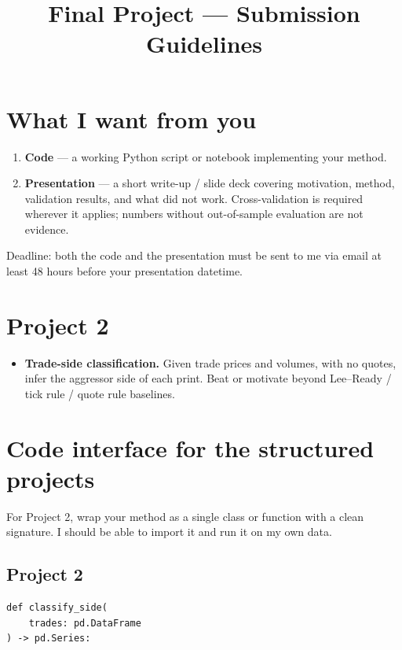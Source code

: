 \documentclass[11pt]{article}
\title{Final Project --- Submission Guidelines}
\author{}
\date{}
\begin{document}
\maketitle


\section*{What I want from you}

\begin{enumerate}
    \item \textbf{Code} --- a working Python script or notebook implementing your method.
    \item \textbf{Presentation} --- a short write-up / slide deck covering motivation, method, validation results, and what did not work. Cross-validation is required wherever it applies; numbers without out-of-sample evaluation are not evidence.
\end{enumerate}

Deadline: both the code and the presentation must be sent to me via email at least 48 hours before your presentation datetime.

\section*{Project 2}

\begin{itemize}

    \item \textbf{Trade-side classification.} Given trade prices and volumes, with no quotes, infer the aggressor side of each print. Beat or motivate beyond Lee--Ready / tick rule / quote rule baselines.

\end{itemize}

\section*{Code interface for the structured projects}

For Project 2, wrap your method as a single class or function with a clean signature. I should be able to import it and run it on my own data.

\subsection*{Project 2}

\begin{verbatim}
def classify_side(
    trades: pd.DataFrame
) -> pd.Series:
\end{verbatim}
\end{document}
